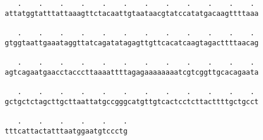 \documentclass{article}
\begin{document}
\begin{Verbatim}
   .    .    .    .    .    .    .    .    .    .    .    . 
attatggtatttattaaagttctacaattgtaataacgtatccatatgacaagttttaaa
                                                            
   .    .    .    .    .    .    .    .    .    .    .    . 
gtggtaattgaaataggttatcagatatagagttgttcacatcaagtagacttttaacag
                                                            
   .    .    .    .    .    .    .    .    .    .    .    . 
agtcagaatgaacctacccttaaaattttagagaaaaaaaatcgtcggttgcacagaata
                                                            
   .    .    .    .    .    .    .    .    .    .    .    . 
gctgctctagcttgcttaattatgccgggcatgttgtcactcctcttacttttgctgcct
                                                            
   .    .    .    .    .    .
tttcattactatttaatggaatgtccctg
                             
                             
\end{Verbatim}
\end{document}
